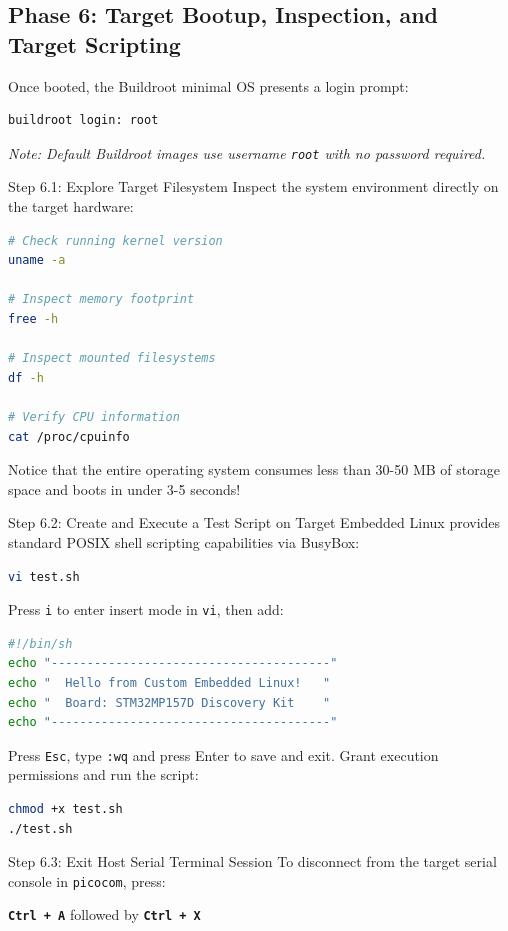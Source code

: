 \subsection{Phase 6: Target Bootup, Inspection, and Target Scripting}

Once booted, the Buildroot minimal OS presents a login prompt:
\begin{lstlisting}[language=bash]
buildroot login: root
\end{lstlisting}
\textit{Note: Default Buildroot images use username \texttt{root} with no password required.}

\begin{cmdbox}{Step 6.1: Explore Target Filesystem}
Inspect the system environment directly on the target hardware:
\begin{lstlisting}[language=bash]
# Check running kernel version
uname -a

# Inspect memory footprint
free -h

# Inspect mounted filesystems
df -h

# Verify CPU information
cat /proc/cpuinfo
\end{lstlisting}
Notice that the entire operating system consumes less than 30-50 MB of storage space and boots in under 3-5 seconds!
\end{cmdbox}

\begin{cmdbox}{Step 6.2: Create and Execute a Test Script on Target}
Embedded Linux provides standard POSIX shell scripting capabilities via BusyBox:
\begin{lstlisting}[language=bash]
vi test.sh
\end{lstlisting}
Press \texttt{i} to enter insert mode in \texttt{vi}, then add:
\begin{lstlisting}[language=bash]
#!/bin/sh
echo "---------------------------------------"
echo "  Hello from Custom Embedded Linux!   "
echo "  Board: STM32MP157D Discovery Kit    "
echo "---------------------------------------"
\end{lstlisting}
Press \texttt{Esc}, type \texttt{:wq} and press Enter to save and exit. Grant execution permissions and run the script:
\begin{lstlisting}[language=bash]
chmod +x test.sh
./test.sh
\end{lstlisting}
\end{cmdbox}

\begin{cmdbox}{Step 6.3: Exit Host Serial Terminal Session}
To disconnect from the target serial console in \texttt{picocom}, press:
\begin{center}
\textbf{\texttt{Ctrl + A}} followed by \textbf{\texttt{Ctrl + X}}
\end{center}
\end{cmdbox}

